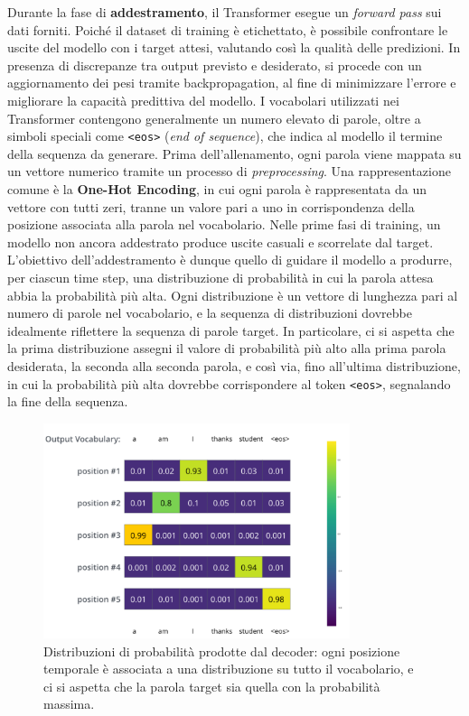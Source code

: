 Durante la fase di \textbf{addestramento}, il Transformer esegue un \textit{forward pass} sui dati forniti. Poiché il dataset di training è etichettato, è possibile confrontare le uscite del modello con i target attesi, valutando così la qualità delle predizioni. In presenza di discrepanze tra output previsto e desiderato, si procede con un aggiornamento dei pesi tramite backpropagation, al fine di minimizzare l’errore e migliorare la capacità predittiva del modello. I vocabolari utilizzati nei Transformer contengono generalmente un numero elevato di parole, oltre a simboli speciali come \texttt{<eos>} (\textit{end of sequence}), che indica al modello il termine della sequenza da generare. Prima dell’allenamento, ogni parola viene mappata su un vettore numerico tramite un processo di \textit{preprocessing}. Una rappresentazione comune è la \textbf{One-Hot Encoding}, in cui ogni parola è rappresentata da un vettore con tutti zeri, tranne un valore pari a uno in corrispondenza della posizione associata alla parola nel vocabolario. Nelle prime fasi di training, un modello non ancora addestrato produce uscite casuali e scorrelate dal target. L’obiettivo dell’addestramento è dunque quello di guidare il modello a produrre, per ciascun time step, una distribuzione di probabilità in cui la parola attesa abbia la probabilità più alta. Ogni distribuzione è un vettore di lunghezza pari al numero di parole nel vocabolario, e la sequenza di distribuzioni dovrebbe idealmente riflettere la sequenza di parole target. In particolare, ci si aspetta che la prima distribuzione assegni il valore di probabilità più alto alla prima parola desiderata, la seconda alla seconda parola, e così via, fino all’ultima distribuzione, in cui la probabilità più alta dovrebbe corrispondere al token \texttt{<eos>}, segnalando la fine della sequenza.

\begin{figure}
    \centering
    \includegraphics[width=0.8\textwidth]{figure/TrainExpectation}
    \caption{Distribuzioni di probabilità prodotte dal decoder: ogni posizione temporale è associata a una distribuzione su tutto il vocabolario, e ci si aspetta che la parola target sia quella con la probabilità massima.}
    \label{fig:trainExp}
\end{figure}

